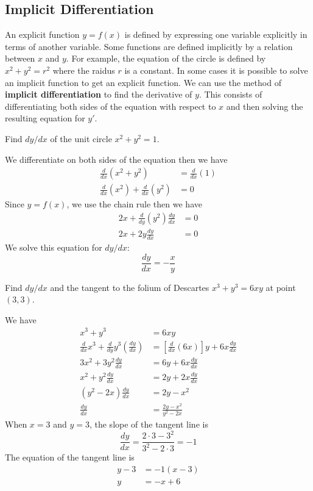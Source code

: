 \subsection{Implicit Differentiation}

An explicit function \(y=f(x)\) is defined by expressing one variable
explicitly in terms of another variable.
Some functions are defined implicitly by a relation between \(x\) and \(y\).
For example, the equation of the circle is defined by \(x^2+y^2=r^2\)
where the raidus \(r\) is a constant.
In some cases it is possible to solve an implicit function to get an explicit function.
We can use the method of \textbf{implicit differentiation} to find the derivative
of \(y\).
This consists of differentiating both sides of the equation with respect to
\(x\) and then solving the resulting equation for \(y'\).
\begin{problem}
    Find \(dy/dx\) of the unit circle \(x^2+y^2=1\).
\end{problem}
\begin{solution}
    We differentiate on both sides of the equation then we have
    \begin{align*}
        \frac{d}{dx}(x^2+y^2) &= \frac{d}{dx}(1) \\
        \frac{d}{dx}(x^2)+\frac{d}{dx}(y^2) &= 0
    \end{align*}
    Since \(y=f(x)\), we use the chain rule then we have
    \begin{align*}
        2x+\frac{d}{dy}(y^2)\frac{dy}{dx} &= 0 \\
        2x+2y\frac{dy}{dx} &= 0
    \end{align*}
    We solve this equation for \(dy/dx\):
    \[\frac{dy}{dx}=-\frac{x}{y}\]
\end{solution}
\begin{problem}
    Find \(dy/dx\) and the tangent to the folium of Descartes \(x^3+y^3=6xy\)
    at point \((3,3)\).
\end{problem}
\begin{solution}
    We have
    \begin{align*}
        x^3+y^3 &= 6xy \\
        \frac{d}{dx}x^3+\frac{d}{dy}y^3\left(\frac{dy}{dx}\right)
        &= \left[\frac{d}{dx}(6x)\right]y+6x\frac{dy}{dx} \\
        3x^2+3y^2\frac{dy}{dx} &= 6y+6x\frac{dy}{dx} \\
        x^2+y^2\frac{dy}{dx} &= 2y+2x\frac{dy}{dx} \\
        (y^2-2x)\frac{dy}{dx} &= 2y-x^2 \\
        \frac{dy}{dx} &= \frac{2y-x^2}{y^2-2x} 
    \end{align*}
    When \(x=3\) and \(y=3\), the slope of the tangent line is
    \[\frac{dy}{dx}=\frac{2\cdot 3-3^2}{3^2-2\cdot 3}=-1\]
    The equation of the tangent line is
    \begin{align*}
        y-3 &= -1(x-3) \\
        y &= -x+6
    \end{align*}
\end{solution}
